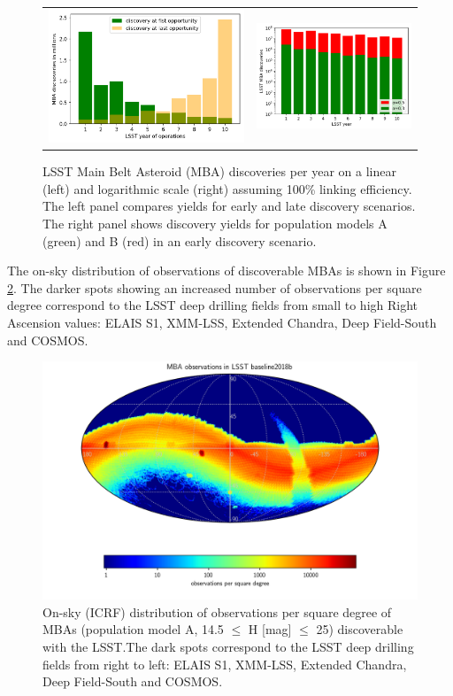 \begin{figure}[tb!]
\begin{center}
\begin{tabular}{cc}
\includegraphics[width=0.5\linewidth]{figs/discovery_time.png} &
\includegraphics[width=0.5\linewidth]{figs/disc_per_yr2.png}
\end{tabular}
\end{center}
\caption{LSST Main Belt Asteroid (MBA) discoveries per year on a linear (left) and logarithmic scale (right) assuming 100\% linking efficiency. The left panel compares yields for early and late discovery scenarios. The right panel shows discovery yields for population models A (green) and B (red) in an early discovery scenario.}
\label{fig:mba_disc_yr}       %
\end{figure}
%
The on-sky distribution of observations of discoverable MBAs is shown in Figure \ref{fig:mba_obs_sky}. The darker spots showing an increased number of observations per square degree correspond to the LSST deep drilling fields from small to high Right Ascension values: ELAIS S1, XMM-LSS, Extended Chandra, Deep Field-South and COSMOS.
\begin{figure}
\begin{center}
\includegraphics[width=0.70\linewidth]{figs/mba_obs_hpmap.png}
\end{center}
\caption{On-sky (ICRF) distribution of observations per square degree of MBAs (population model A, 14.5 $\le$ H [mag] $\le$ 25) discoverable with the LSST.The dark spots correspond to the LSST deep drilling fields from right to left: ELAIS S1, XMM-LSS, Extended Chandra, Deep Field-South and COSMOS.}
\label{fig:mba_obs_sky}       %
\end{figure}
